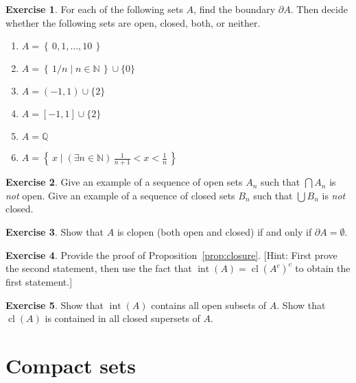 \documentclass[11pt,oneside]{amsbook}
\newcommand{\set}[1]{\left\{\,#1\,\right\}}
\newcommand{\N}{\mathbb N}
\newcommand{\Q}{\mathbb Q}
\DeclareMathOperator{\cl}{cl}
\DeclareMathOperator{\inte}{int}
\theoremstyle{definition}
\newtheorem{exerc}{Exercise}[section]
\theoremstyle{plain}
\theoremstyle{definition}
\theoremstyle{remark}
\numberwithin{equation}{section}
\numberwithin{figure}{section}
\begin{document}
\begin{exerc}
  For each of the following sets $A$, find the boundary $\partial A$. Then decide whether the following sets are open, closed, both, or neither.
  \begin{enumerate}
    \item $A=\set{0,1,\ldots,10}$
    \item $A=\set{1/n\mid n\in\N}\cup\{0\}$
    \item $A=(-1,1)\cup\{2\}$
    \item $A=[-1,1]\cup\{2\}$
    \item $A=\Q$
    \item $A=\set{x\mid (\exists n\in\N)\,\frac1{n+1}<x<\frac1n}$
  \end{enumerate}
\end{exerc}

\begin{exerc}
  Give an example of a sequence of open sets $A_n$ such that $\bigcap A_n$ is \emph{not} open. Give an example of a sequence of closed sets $B_n$ such that $\bigcup B_n$ is \emph{not} closed.
\end{exerc}



\begin{exerc}
  Show that $A$ is clopen (both open and closed) if and only if $\partial A=\emptyset$.
\end{exerc}

\begin{exerc}
  Provide the proof of Proposition~\ref{prop:closure}. [Hint: First prove the second statement, then use the fact that $\inte(A)=\cl(A^c)^c$ to obtain the first statement.]
\end{exerc}

\begin{exerc}
  Show that $\inte(A)$ contains all open subsets of $A$. Show that $\cl(A)$ is contained in all closed supersets of $A$.
\end{exerc}


\newpage
\section{Compact sets}
\end{document}
